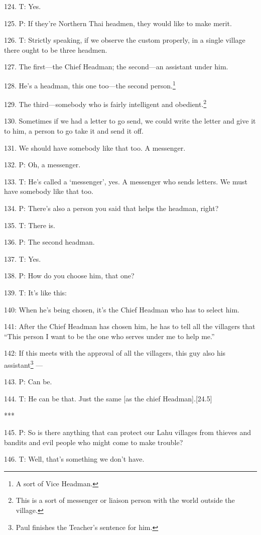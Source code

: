 124. T: Yes.

125. P: If they're Northern Thai headmen, they would like to make merit.

126. T: Strictly speaking, if we observe the custom properly, in a single village
there ought to be three headmen.

127. The first---the Chief Headman; the second---an assistant under him.

128. He's a headman, this one too---the second person.\footnote{A sort of Vice Headman.}

129. The third---somebody who is fairly intelligent and obedient.\footnote{This is a sort of messenger or liaison person with the world outside the village.}

130. Sometimes if we had a letter to go send, we could write the letter and give
it to him, a person to go take it and send it off.

131. We should have somebody like that too. A messenger.

132. P: Oh, a messenger.

133. T: He's called a `messenger', yes. A messenger who sends letters. We must
have somebody like that too.

134. P: There's also a person you said that helps the headman, right?

135. T: There is.

136. P: The second headman.

137. T: Yes.

138. P: How do you choose him, that one?

139. T: It's like this:

140: When he's being chosen, it's the Chief Headman who has to select him.

141: After the Chief Headman has chosen him, he has to tell all the villagers that
``This person I want to be the one who serves under me to help me.''

142: If this meets with the approval of all the villagers, this guy also his assistant\footnote{Paul finishes the Teacher's sentence for him.}
---

143. P: Can be.

144. T: He can be that. Just the same [as the chief Headman].[24.5]

***

145. P: So is there anything that can protect our Lahu villages from thieves and
bandits and evil people who might come to make trouble?

146. T: Well, that's something we don't have.

